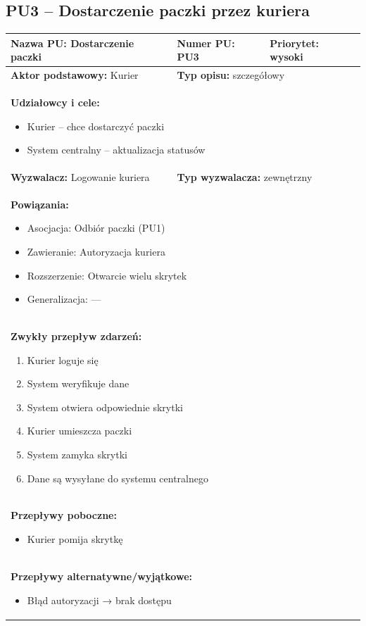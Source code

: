 \documentclass[a4paper,12pt]{article}
\begin{document}
\vspace{1cm}

\subsection{PU3 – Dostarczenie paczki przez kuriera}

\begin{tabular}{|p{6cm}|p{4cm}|p{5cm}|}
\hline
\textbf{Nazwa PU:} Dostarczenie paczki &
\textbf{Numer PU:} PU3 &
\textbf{Priorytet:} wysoki \\
\hline
\textbf{Aktor podstawowy:} Kurier &
\multicolumn{2}{p{9cm}|}{\textbf{Typ opisu:} szczegółowy} \\
\hline
\multicolumn{3}{|p{15cm}|}{
\textbf{Udziałowcy i cele:}
\begin{itemize}
\item Kurier – chce dostarczyć paczki
\item System centralny – aktualizacja statusów
\end{itemize}
} \\
\hline
\textbf{Wyzwalacz:} Logowanie kuriera &
\multicolumn{2}{p{9cm}|}{\textbf{Typ wyzwalacza:} zewnętrzny} \\
\hline
\multicolumn{3}{|p{15cm}|}{
\textbf{Powiązania:}
\begin{itemize}
\item Asocjacja: Odbiór paczki (PU1)
\item Zawieranie: Autoryzacja kuriera
\item Rozszerzenie: Otwarcie wielu skrytek
\item Generalizacja: —
\end{itemize}
} \\
\hline
\multicolumn{3}{|p{15cm}|}{
\textbf{Zwykły przepływ zdarzeń:}
\begin{enumerate}
\item Kurier loguje się
\item System weryfikuje dane
\item System otwiera odpowiednie skrytki
\item Kurier umieszcza paczki
\item System zamyka skrytki
\item Dane są wysyłane do systemu centralnego
\end{enumerate}
} \\
\hline
\multicolumn{3}{|p{15cm}|}{
\textbf{Przepływy poboczne:}
\begin{itemize}
\item Kurier pomija skrytkę
\end{itemize}
} \\
\hline
\multicolumn{3}{|p{15cm}|}{
\textbf{Przepływy alternatywne/wyjątkowe:}
\begin{itemize}
\item Błąd autoryzacji → brak dostępu
\end{itemize}
} \\
\hline
\end{tabular}
\end{document}
